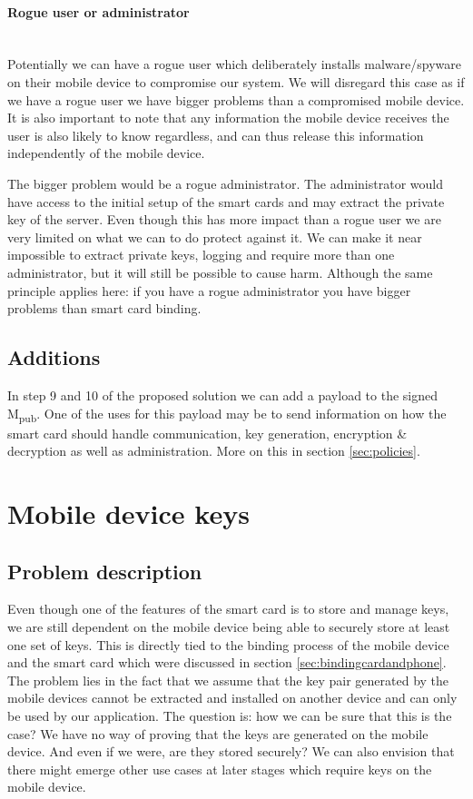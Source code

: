 \paragraph{Rogue user or administrator}\mbox{}\\
Potentially we can have a rogue user which deliberately installs malware/spyware on their mobile device to compromise our system. We will disregard this case as if we have a rogue user we have bigger problems than a compromised mobile device. It is also important to note that any information the mobile device receives the user is also likely to know regardless, and can thus release this information independently of the mobile device.

The bigger problem would be a rogue administrator. The administrator would have access to the initial setup of the smart cards and may extract the private key of the server. Even though this has more impact than a rogue user we are very limited on what we can to do protect against it. We can make it near impossible to extract private keys, logging and require more than one administrator, but it will still be possible to cause harm. Although the same principle applies here: if you have a rogue administrator you have bigger problems than smart card binding.


\subsection{Additions}
In step 9 and 10 of the proposed solution we can add a payload to the signed M\textsubscript{pub}. One of the uses for this payload may be to send information on how the smart card should handle communication, key generation, encryption \& decryption as well as administration. More on this in section \ref{sec:policies}.


\section{Mobile device keys}
\label{sec:mobileDeviceKeys}


\subsection{Problem description}
Even though one of the features of the smart card is to store and manage keys, we are still dependent on the mobile device being able to securely store at least one set of keys. This is directly tied to the binding process of the mobile device and the smart card which were discussed in section \ref{sec:bindingcardandphone}. The problem lies in the fact that we assume that the key pair generated by the mobile devices cannot be extracted and installed on another device and can only be used by our application. The question is: how we can be sure that this is the case? We have no way of proving that the keys are generated on the mobile device. And even if we were, are they stored securely? We can also envision that there might emerge other use cases at later stages which require keys on the mobile device.

